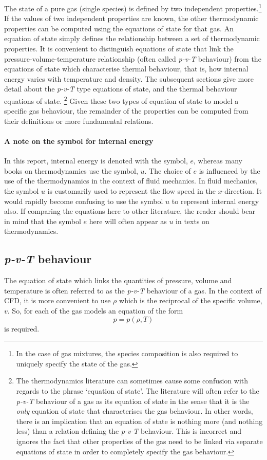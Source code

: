 The state of a pure gas (single species) is defined by two independent
properties.\footnote{In the case of gas mixtures, the species composition
is also required to uniquely specify the state of the gas.}
If the values of two independent properties are known, 
the other thermodynamic properties can be computed using the
equations of state for that gas.
An equation of state simply defines the relationship
between a set of thermodynamic properties.
It is convenient to distinguish equations of state
that link the pressure-volume-temperature relationship
(often called \textit{p-v-T} behaviour) from the equations of state
which characterise thermal behaviour, that is, how internal
energy varies with temperature and density.
The subsequent sections give more detail about the \textit{p-v-T} type
equations of state, and the thermal behaviour equations of state.
\footnote{The thermodynamics literature can sometimes cause some confusion
with regards to the phrase `equation of state'.
The literature will often refer to the \textit{p-v-T} behaviour of a gas as
its equation of state in the sense that it is the \emph{only}
equation of state that characterises the gas behaviour.
In other words, there is an implication that an equation of state is
nothing more (and nothing less) than a relation defining the \textit{p-v-T}
behaviour.
This is incorrect and ignores the fact that other properties of the gas
need to be linked via separate equations of state in order to completely
specify the gas behaviour.}
Given these two types of equation of state to model a specific gas
behaviour, the remainder of the properties can be computed from their
definitions or more fundamental relations.

\paragraph{A note on the symbol for internal energy}
In this report, internal energy is denoted with the symbol, $e$, whereas
many books on thermodynamics use the symbol, $u$.
The choice of $e$ is influenced by the use of the thermodynamics in the
context of fluid mechanics.
In fluid mechanics, the symbol $u$ is customarily used to represent
the flow speed in the $x$-direction.
It would rapidly become confusing to use the symbol $u$ to represent
internal energy also.
If comparing the equations here to other literature, the reader should bear
in mind that the symbol $e$ here will
often appear as $u$ in texts on thermodynamics.

\subsection{\textit{p-v-T} behaviour}
The equation of state which links the quantities of pressure, volume and temperature
is often referred to as the \textit{p-v-T} behaviour of a gas.
In the context of CFD, it is more convenient to use $\rho$ which is the
reciprocal of the specific volume, $v$.
So, for each of the gas models an equation of the form
\[ p = p(\rho, T) \]
is required.

